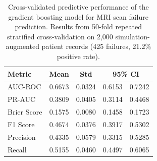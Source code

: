 \begin{table}[H]
\centering
\caption{Cross-validated predictive performance of the gradient boosting model for MRI scan failure prediction. Results from 50-fold repeated stratified cross-validation on 2,000 simulation-augmented patient records (425 failures, 21.2\% positive rate).}
\label{tab:ml_cv_metrics}
\begin{tabular}{lcccc}
\toprule
Metric & Mean & Std & \multicolumn{2}{c}{95\% CI} \\
\midrule
AUC-ROC & 0.6673 & 0.0324 & 0.6153 & 0.7242 \\
PR-AUC & 0.3809 & 0.0405 & 0.3114 & 0.4468 \\
Brier Score & 0.1575 & 0.0080 & 0.1458 & 0.1723 \\
F1 Score & 0.4674 & 0.0376 & 0.3917 & 0.5302 \\
Precision & 0.4335 & 0.0579 & 0.3315 & 0.5285 \\
Recall & 0.5155 & 0.0460 & 0.4497 & 0.6065 \\
\bottomrule
\end{tabular}
\end{table}
